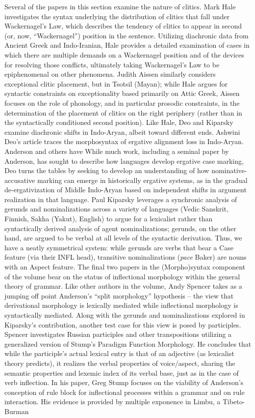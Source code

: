 \begin{refsection}
Several of the papers in this section examine the nature of clitics. Mark Hale investigates the syntax underlying the distribution of clitics that fall under Wackernagel's Law, which describes the tendency of clitics to appear in second (or, now, “Wackernagel”) position in the sentence. Utilizing diachronic data from Ancient Greek and Indo-Iranian, Hale provides a detailed examination of cases in which there are multiple demands on a Wackernagel position and of the devices for resolving those conflicts, ultimately taking Wackernagel's Law to be epiphenomenal on other phenomena. Judith Aissen similarly considers exceptional clitic placement, but in Tsotsil (Mayan); while Hale argues for syntactic constraints on exceptionality based primarily on Attic Greek, Aissen focuses on the role of phonology, and in particular prosodic constraints, in the determination of the placement of clitics on the right periphery (rather than in the syntactically conditioned second position). Like Hale, Deo and Kiparsky examine diachronic shifts in Indo-Aryan, albeit toward different ends. Ashwini Deo's article traces the morphosyntax of ergative alignment loss in Indo-Aryan. Anderson and others have While much work, including a seminal paper by Anderson, has sought to describe how languages develop ergative case marking, Deo turns the tables by seeking to develop an understanding of how nominative-accusative marking can emerge in historically ergative systems, as in the gradual de-ergativization of Middle Indo-Aryan based on independent shifts in argument realization in that language. Paul Kiparsky leverages a synchronic analysis of gerunds and nominalizations across a variety of languages (Vedic Sanskrit, Finnish, Sakha (Yakut), English) to argue for a lexicalist rather than syntactically derived analysis of agent nominalizations; gerunds, on the other hand, are argued to be verbal at all levels of the syntactic derivation. Thus, we have a neatly symmetrical system: while gerunds are verbs that bear a Case feature (via their INFL head), transitive nominalizations (\textit{pace} Baker) are nouns with an Aspect feature. The final two papers in the (Morpho)syntax component of the volume bear on the status of inflectional morphology within the general theory of grammar. Like other authors in the volume, Andy Spencer takes as a jumping off point Anderson's “split morphology” hypothesis -- the view that derivational morphology is lexically mediated while inflectional morphology is syntactically mediated.  Along with the gerunds and nominalizations explored in Kiparsky's contribution, another test case for this view is posed by participles. Spencer investigates Russian participles and other transpositions utilizing a generalized version of Stump's Paradigm Function Morphology. He concludes that while the participle's actual lexical entry is that of an adjective (as lexicalist theory predicts), it realizes the verbal properties of voice/aspect, sharing the semantic properties and lexemic index of its verbal base, just as in the case of verb inflection. In his paper, Greg Stump focuses on the viability of Anderson's conception of rule block for inflectional processes within a grammar and on rule interaction. His evidence is provided by multiple exponence in Limbu, a Tibeto-Burman 
\end{refsection}
